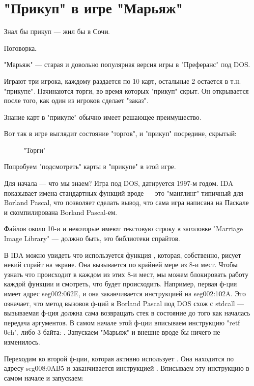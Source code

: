 \section{"Прикуп" в игре "Марьяж"}

\epigraph{Знал бы прикуп --- жил бы в Сочи.}{Поговорка.}

"Марьяж" --- старая и довольно популярная версия игры в "Преферанс" под DOS.

Играют три игрока, каждому раздается по 10 карт, остальные 2 остается в т.н. "прикупе".
Начинаются торги, во время которых "прикуп" скрыт.
Он открывается после того, как один из игроков сделает "заказ".

Знание карт в "прикупе" обычно имеет решающее преимущество.

Вот так в игре выглядит состояние "торгов", и "прикуп" посредине, скрытый:

\begin{figure}[H]
\centering
{}
\caption{"Торги"}
\end{figure}

Попробуем "подсмотреть" карты в "прикупе" в этой игре.

Для начала --- что мы знаем?
Игра под DOS, датируется 1997-м годом. IDA показывает имена стандартных функций вроде 
 --- это "манглинг" типичный для Borland Pascal, что позволяет сделать вывод,
что сама игра написана на Паскале и скомпилирована Borland Pascal-ем.

Файлов около 10-и и некоторые имеют текстовую строку в заголовке "Marriage Image Library" --- должно быть,
это библиотеки спрайтов.

В IDA можно увидеть что используется функция , которая, собственно,
рисует некий спрайт на экране.
Она вызывается по крайней мере из 8-и мест.
Чтобы узнать что происходит в каждом из этих 8-и мест, мы можем блокировать работу каждой функции и смотреть,
что будет происходить.
Например, первая ф-ция имеет адрес seg002:062E, и она заканчивается инструкцией  на seg002:102A.
Это означает, что метод вызовов ф-ций в Borland Pascal под DOS схож с stdcall --- вызываемая ф-ция должна сама
возвращать стек в состояние до того как началась передача аргументов.
В самом начале этой ф-ции вписываем инструкцию "retf 0eh", либо 3 байта: .
Запускаем "Марьяж" и внешне вроде бы ничего не изменилось.

Переходим ко второй ф-ции, которая активно использует .
Она находится по адресу seg008:0AB5 и заканчивается инструкцией .
Вписываем эту инструкцию в самом начале и запускаем:

